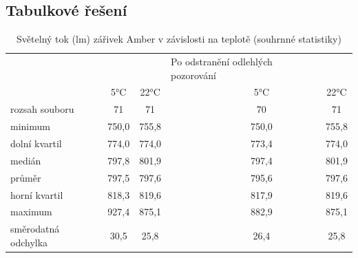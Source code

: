 \documentclass[czech]{article}%
\begin{document}
\subsection{Tabulkové řešení}
\noindent
\begin{table}[H]
	\centering
	\caption{Světelný tok (lm) zářivek Amber v závislosti na teplotě (souhrnné statistiky)}
	\label{tab:statAmber}
	\begin{tabular}{lccl|cc}
        \hline
        \rowcolor[HTML]{F2F2F2} 
        \multicolumn{2}{l}{\cellcolor[HTML]{F2F2F2}Světelný tok zářivek Amber (lm)} & & & \multicolumn{2}{l}{\cellcolor[HTML]{F2F2F2}Po   odstranění odlehlých pozorování} \\
        \rowcolor[HTML]{F2F2F2} 
        \hline
        & 5°C             & 22°C             && 5°C                                    & 22°C                                    \\
        \hline
        rozsah souboru           & 71                          & 71                           &  & 70                                     & 71                                   \\
        minimum                  & 750,0                       & 755,8                        &  & 750,0                                  & 755,8                                   \\
        dolní kvartil            & 774,0                       & 774,0                        &  & 773,4                                  & 774,0                                   \\
        medián                   & 797,8                       & 801,9                        &  & 797,4                                  & 801,9                                   \\
        průměr                   & 797,5                       & 797,6                        &  & 795,6                                  & 797,6                                   \\
        horní kvartil            & 818,3                       & 819,6                        &  & 817,9                                  & 819,6                                   \\
        maximum                  & 927,4                       & 875,1                        &  & 882,9                                  & 875,1                                   \\
        směrodatná odchylka      & 30,5                        & 25,8                         &  & 26,4                                   & 25,8                                    \\

\end{tabular}
\end{table}
\end{document}
